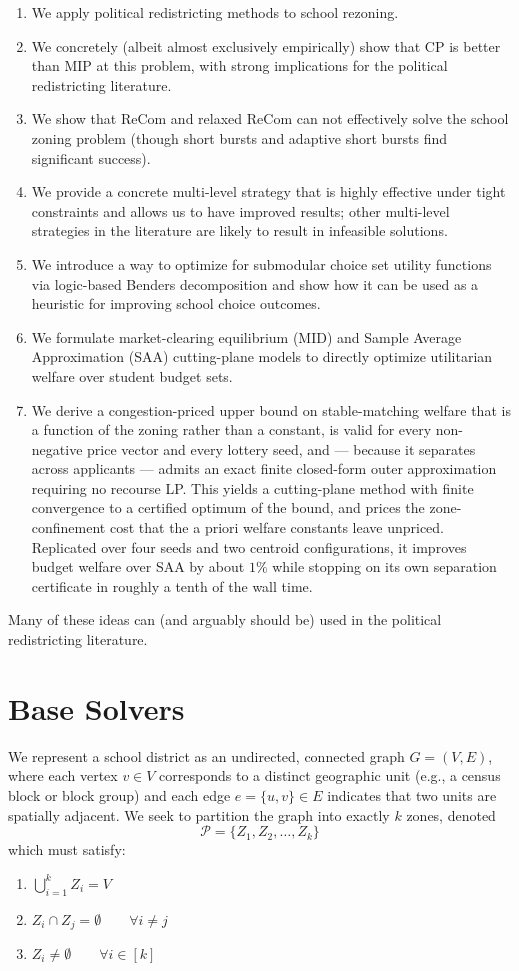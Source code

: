 \documentclass{article}
\begin{document}
\begin{enumerate}
    \item We apply political redistricting methods to school rezoning.
    \item We concretely (albeit almost exclusively empirically) show that CP is better than MIP at this problem, with strong implications for the political redistricting literature.
    \item We show that ReCom and relaxed ReCom can not effectively solve the school zoning problem (though short bursts and adaptive short bursts find significant success).
    \item We provide a concrete multi-level strategy that is highly effective under tight constraints and allows us to have improved results; other multi-level strategies in the literature are likely to result in infeasible solutions.
    \item We introduce a way to optimize for submodular choice set utility functions via logic-based Benders decomposition and show how it can be used as a heuristic for improving school choice outcomes.
    \item We formulate market-clearing equilibrium (MID) and Sample Average Approximation (SAA) cutting-plane models to directly optimize utilitarian welfare over student budget sets.
    \item We derive a congestion-priced upper bound on stable-matching welfare that is a function of the zoning rather than a constant, is valid for every non-negative price vector and every lottery seed, and --- because it separates across applicants --- admits an exact finite closed-form outer approximation requiring no recourse LP. This yields a cutting-plane method with finite convergence to a certified optimum of the bound, and prices the zone-confinement cost that the a priori welfare constants leave unpriced. Replicated over four seeds and two centroid configurations, it improves budget welfare over SAA by about $1\%$ while stopping on its own separation certificate in roughly a tenth of the wall time.
\end{enumerate}

Many of these ideas can (and arguably should be) used in the political redistricting literature.

\section{Base Solvers}
We represent a school district as an undirected, connected graph $G = (V, E)$, where each vertex $v \in V$ corresponds to a distinct geographic unit (e.g., a census block or block group) and each edge $e = \{u, v\} \in E$ indicates that two units are spatially adjacent. We seek to partition the graph into exactly $k$ zones, denoted  $$\mathcal{P} = \{Z_1, Z_2, \dots, Z_k\}$$ which must satisfy:
\begin{enumerate}
    \item $\bigcup_{i=1}^k Z_i = V$
    \item $Z_i \cap Z_j = \emptyset \qquad \forall i \neq j$
    \item $Z_i \neq \emptyset \qquad \forall i \in [k]$
\end{enumerate}
\end{document}
